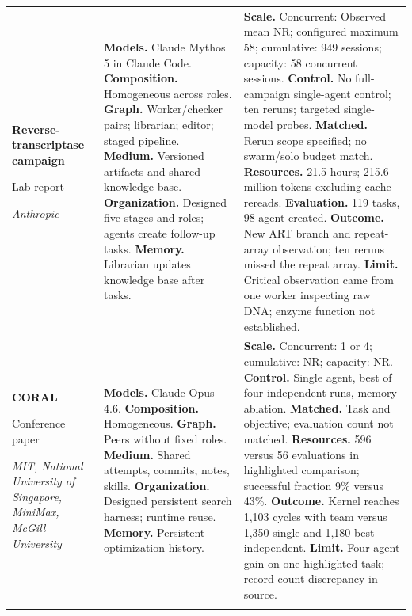 \begin{longtable}{@{}>{\raggedright\arraybackslash}p{}>{\raggedright\arraybackslash}p{}>{\raggedright\arraybackslash}p{}@{}}
\textbf{Reverse-transcriptase campaign}\par \citep{anthropic-art-enzymes}\par Lab report\par\emph{Anthropic} & \textbf{Models.} Claude Mythos 5 in Claude Code. \textbf{Composition.} Homogeneous across roles. \textbf{Graph.} Worker/checker pairs; librarian; editor; staged pipeline. \textbf{Medium.} Versioned artifacts and shared knowledge base. \textbf{Organization.} Designed five stages and roles; agents create follow-up tasks. \textbf{Memory.} Librarian updates knowledge base after tasks. & \textbf{Scale.} Concurrent: Observed mean NR; configured maximum 58; cumulative: 949 sessions; capacity: 58 concurrent sessions. \textbf{Control.} No full-campaign single-agent control; ten reruns; targeted single-model probes. \textbf{Matched.} Rerun scope specified; no swarm/solo budget match. \textbf{Resources.} 21.5 hours; 215.6 million tokens excluding cache rereads. \textbf{Evaluation.} 119 tasks, 98 agent-created. \textbf{Outcome.} New ART branch and repeat-array observation; ten reruns missed the repeat array. \textbf{Limit.} Critical observation came from one worker inspecting raw DNA; enzyme function not established. \\ \addlinespace[5pt]
\textbf{CORAL}\par \citep{coral}\par Conference paper\par\emph{MIT, National University of Singapore, MiniMax, McGill University} & \textbf{Models.} Claude Opus 4.6. \textbf{Composition.} Homogeneous. \textbf{Graph.} Peers without fixed roles. \textbf{Medium.} Shared attempts, commits, notes, skills. \textbf{Organization.} Designed persistent search harness; runtime reuse. \textbf{Memory.} Persistent optimization history. & \textbf{Scale.} Concurrent: 1 or 4; cumulative: NR; capacity: NR. \textbf{Control.} Single agent, best of four independent runs, memory ablation. \textbf{Matched.} Task and objective; evaluation count not matched. \textbf{Resources.} 596 versus 56 evaluations in highlighted comparison; successful fraction 9\% versus 43\%. \textbf{Outcome.} Kernel reaches 1,103 cycles with team versus 1,350 single and 1,180 best independent. \textbf{Limit.} Four-agent gain on one highlighted task; record-count discrepancy in source. \\ \addlinespace[5pt]

\end{longtable}
